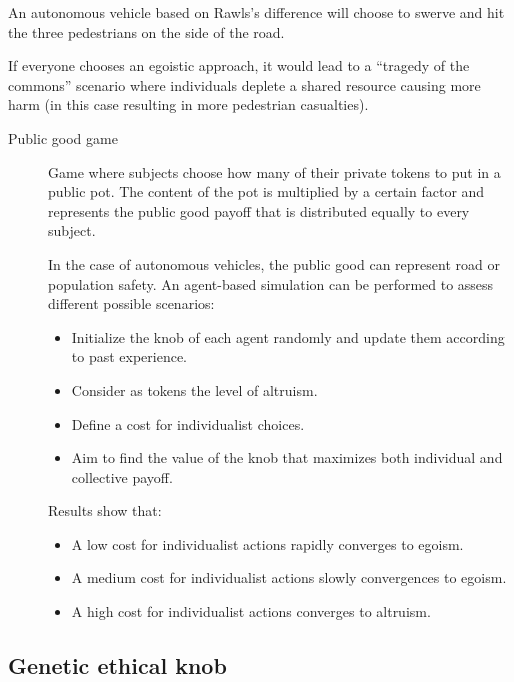 \begin{description}
\begin{remark}
\begin{example}
                An autonomous vehicle based on Rawls's difference will choose to swerve and hit the three pedestrians on the side of the road.
            \end{example}
        \end{remark}
\end{description}

\begin{remark}
    If everyone chooses an egoistic approach, it would lead to a ``tragedy of the commons'' scenario where individuals deplete a shared resource causing more harm (in this case resulting in more pedestrian casualties).
\end{remark}


\begin{description}
    \item[Public good game] 
        Game where subjects choose how many of their private tokens to put in a public pot. The content of the pot is multiplied by a certain factor and represents the public good payoff that is distributed equally to every subject.

        In the case of autonomous vehicles, the public good can represent road or population safety. An agent-based simulation can be performed to assess different possible scenarios:
        \begin{itemize}
            \item Initialize the knob of each agent randomly and update them according to past experience.
            \item Consider as tokens the level of altruism.
            \item Define a cost for individualist choices.
            \item Aim to find the value of the knob that maximizes both individual and collective payoff.
        \end{itemize}
        Results show that:
        \begin{itemize}
            \item A low cost for individualist actions rapidly converges to egoism.
            \item A medium cost for individualist actions slowly convergences to egoism.
            \item A high cost for individualist actions converges to altruism.
        \end{itemize}
\end{description}


\subsection{Genetic ethical knob}

